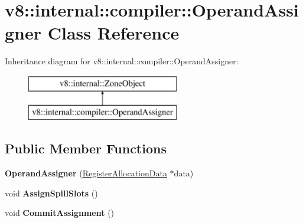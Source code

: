 \hypertarget{classv8_1_1internal_1_1compiler_1_1_operand_assigner}{}\section{v8\+:\+:internal\+:\+:compiler\+:\+:Operand\+Assigner Class Reference}
\label{classv8_1_1internal_1_1compiler_1_1_operand_assigner}
Inheritance diagram for v8\+:\+:internal\+:\+:compiler\+:\+:Operand\+Assigner\+:\begin{figure}[H]
\begin{center}
\leavevmode
\includegraphics[height=2.000000cm]{classv8_1_1internal_1_1compiler_1_1_operand_assigner}
\end{center}
\end{figure}
\subsection*{Public Member Functions}
\begin{DoxyCompactItemize}
\item 
{\bfseries Operand\+Assigner} (\hyperlink{classv8_1_1internal_1_1compiler_1_1_register_allocation_data}{Register\+Allocation\+Data} $\ast$data)\hypertarget{classv8_1_1internal_1_1compiler_1_1_operand_assigner_a7ca2c1a36fcbdc35dcca5d1ef1e4a382}{}\label{classv8_1_1internal_1_1compiler_1_1_operand_assigner_a7ca2c1a36fcbdc35dcca5d1ef1e4a382}

\item 
void {\bfseries Assign\+Spill\+Slots} ()\hypertarget{classv8_1_1internal_1_1compiler_1_1_operand_assigner_ad6584f898499c7916d684cb5b7752b4b}{}\label{classv8_1_1internal_1_1compiler_1_1_operand_assigner_ad6584f898499c7916d684cb5b7752b4b}

\item 
void {\bfseries Commit\+Assignment} ()\hypertarget{classv8_1_1internal_1_1compiler_1_1_operand_assigner_a52c0f0a8cb23f3e0de4b701af4d4b8f0}{}\label{classv8_1_1internal_1_1compiler_1_1_operand_assigner_a52c0f0a8cb23f3e0de4b701af4d4b8f0}

\end{DoxyCompactItemize}
